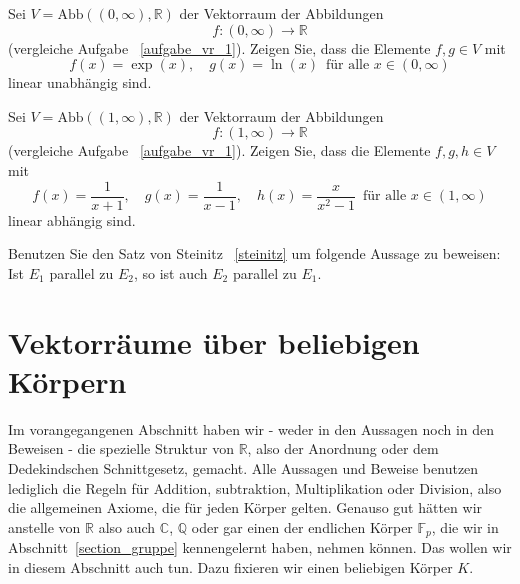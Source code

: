 \begin{aufgabe}\label{aufgabe_vr_3}  Sei $V = \textrm{Abb}((0, \infty), \mathbb R)$ der Vektorraum der Abbildungen
  	$$ f : (0, \infty) \longrightarrow \mathbb R $$
(vergleiche Aufgabe ~\ref{aufgabe_vr_1}). Zeigen Sie, dass die Elemente $f, g \in V$ mit 
  	$$ f(x) = \exp(x), \quad g(x) = \ln(x) \, \textrm{ für alle } x \in (0, \infty) $$
linear unabhängig sind.
\end{aufgabe} 

\begin{aufgabe}\label{aufgabe_vr_4} Sei $V = \textrm{Abb}((1, \infty), \mathbb R)$ der Vektorraum der Abbildungen
  	$$ f : (1, \infty) \longrightarrow \mathbb R $$
(vergleiche Aufgabe ~\ref{aufgabe_vr_1}). Zeigen Sie, dass die Elemente $f, g, h \in V$ mit 
  	$$ f(x) = \frac {1}{x+1}, \quad g(x) = \frac {1}{x-1}, \quad h(x) = \frac {x}{x^2-1} 
	\, \textrm{ für alle } x \in (1, \infty) $$
linear abhängig sind.
\end{aufgabe}

\begin{aufgabe} Benutzen Sie den Satz von Steinitz ~\ref{steinitz} um folgende Aussage zu beweisen:
Ist $E_1$ parallel zu $E_2$, so ist auch $E_2$ parallel zu $E_1$.
\end{aufgabe}

\bigbreak

\newpage


\section{Vektorräume über beliebigen Körpern}\label{sect_vr_beliebig}

\setcounter{definition}{0}
\setcounter{beispiel}{0}
\setcounter{notiz}{0}

Im vorangegangenen Abschnitt haben wir - weder in den Aussagen noch in den Beweisen - 
die spezielle Struktur von $\mathbb R$, also der Anordnung oder dem Dedekindschen 
Schnittgesetz, gemacht. Alle Aussagen und Beweise benutzen lediglich die Regeln  
für Addition, subtraktion, Multiplikation oder Division, also die allgemeinen 
Axiome, die für jeden Körper gelten. Genauso gut hätten wir anstelle von 
$\mathbb R$ also auch $\mathbb C$, $\mathbb Q$ oder gar einen der endlichen Körper  
$\mathbb F_p$, die wir in Abschnitt~\ref{section_gruppe} kennengelernt haben, nehmen 
können. Das wollen wir in diesem Abschnitt auch tun. Dazu fixieren wir einen 
beliebigen Körper $K$.



